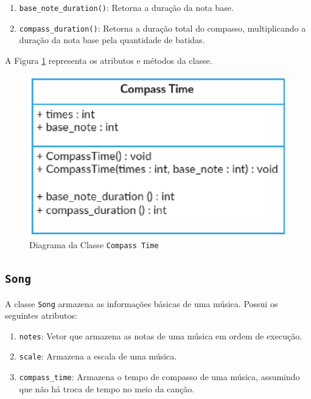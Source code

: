       \begin{enumerate}
        \item \texttt{base\_note\_duration()}: Retorna a duração da nota base.
        \item \texttt{compass\_duration()}: Retorna a duração total do compasso, multiplicando a duração da nota base pela quantidade de batidas.
      \end{enumerate}


      A Figura \ref{compasstimeclass} representa os atributos e métodos da classe.

      \begin{figure}[htb]
        \centering
        \includegraphics[scale=0.7]{figuras/compasstimeclass.eps}
        \caption{Diagrama da Classe \texttt{Compass Time}}
        \label{compasstimeclass}
      \end{figure}

    \subsection[\texttt{Song}]{\texttt{Song}}

      A classe \texttt{Song} armazena as informações básicas de uma música. Possui os seguintes atributos:

      \begin{enumerate}
        \item \texttt{notes}: Vetor que armazena as notas de uma música em ordem de execução.
        \item \texttt{scale}: Armazena a escala de uma música.
        \item \texttt{compass\_time}: Armazena o tempo de compasso de uma música, assumindo que não há troca de tempo no meio da canção.
      \end{enumerate}

